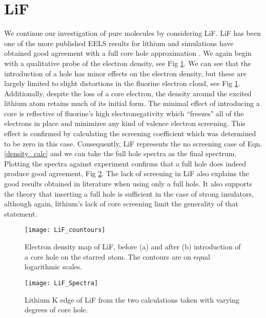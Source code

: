 \section{LiF}
We continue our investigation of pure molecules by considering LiF.  LiF has been one of the more published EELS results for lithium and simulations have obtained good agreement with a full core hole approximation \cite{mauchamp_ab_2006}.  We again begin with a qualitative probe of the electron density, see Fig \ref{LiF_countours}.  We can see that the introduction of a hole has minor effects on the electron density, but these are largely limited to slight distortions in the fluorine electron cloud, see Fig \ref{LiF_countours}. Additionally, despite the loss of a core electron, the density around the excited lithium atom retains much of its initial form. The minimal effect of introducing a core is reflective of fluorine's high electronegativity which ``freezes" all of the electrons in place and minimizes any kind of valence electron screening.  This effect is confirmed by calculating the screening coefficient which was determined to be zero in this case. Consequently, LiF represents the no screening case of Eqn. \ref{density_calc} and we can take the full hole spectra as the final spectrum.  Plotting the spectra against experiment confirms that a full hole does indeed produce good agreement, Fig \ref{LiF_spectra}.  The lack of screening in LiF also explains the good results obtained in literature when using only a full hole.  It also supports the theory that inserting a full hole is sufficient in the case of strong insulators, although again, lithium's lack of core screening limit the generality of that statement.  

\begin{figure}
	\centering
	\texttt{[image: LiF\_countours]}
	\caption{Electron density map of LiF, before (a) and after (b) introduction of a core hole on the starred atom.  The contours are on equal logarithmic scales.}
	\label{LiF_countours}
\end{figure}

\begin{figure}
	\centering
	\texttt{[image: LiF\_Spectra]}
	\caption{Lithium K edge of LiF from the two calculations taken with varying degrees of core hole. }
	\label{LiF_spectra}
\end{figure}



